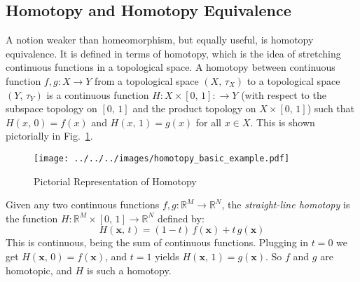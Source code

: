 \documentclass{article}
\theoremstyle{plain}
\theoremstyle{normal}
\newenvironment{example}{%
    \pushQED{\qed}\renewcommand{\qedsymbol}{$\blacksquare$}\examplex%
}{%
    \popQED\endexamplex%
}
\newenvironment{definition}{%
    \pushQED{\qed}\renewcommand{\qedsymbol}{$\blacksquare$}\definitionx%
}{%
    \popQED\enddefinitionx%
}
\begin{document}
        \subsection{Homotopy and Homotopy Equivalence}
            A notion weaker than homeomorphism, but equally useful, is
            homotopy equivalence.
            It is defined in terms of homotopy, which is
            the idea of stretching continuous functions in a topological space.
            \begin{definition}[Homotopy]
                A homotopy between continuous function
                $f,g:X\rightarrow{Y}$ from a topological space $(X,\,\tau_{X})$
                to a topological space $(Y,\,\tau_{Y})$ is a continuous
                function $H:X\times[0,\,1]:\rightarrow{Y}$
                (with respect to the subspace topology on $[0,\,1]$ and the
                product topology on $X\times[0,\,1]$) such that
                $H(x,\,0)=f(x)$ and $H(x,\,1)=g(x)$ for all $x\in{X}$.
            \end{definition}
            This is shown pictorially in Fig.~\ref{fig:homotopy_basic_example}.
            \begin{figure}
                \centering
                \texttt{[image: ../../../images/homotopy\_basic\_example.pdf]}
                \caption{Pictorial Representation of Homotopy}
                \label{fig:homotopy_basic_example}
            \end{figure}
            \begin{example}
                Given any two continuous functions
                $f,g:\mathbb{R}^{M}\rightarrow\mathbb{R}^{N}$, the
                \textit{straight-line homotopy}%
                is the function
                $H:\mathbb{R}^{M}\times[0,\,1]\rightarrow\mathbb{R}^{N}$
                defined by:
                \begin{equation}
                    H(\mathbf{x},\,t)=
                    (1-t)\,f(\mathbf{x})+t\,g(\mathbf{x})
                \end{equation}
                This is continuous, being the sum of continuous functions.
                Plugging in $t=0$ we get $H(\mathbf{x},\,0)=f(\mathbf{x})$,
                and $t=1$ yields $H(\mathbf{x},\,1)=g(\mathbf{x})$. So
                $f$ and $g$ are homotopic, and $H$ is such a homotopy.
            \end{example}
\end{document}
